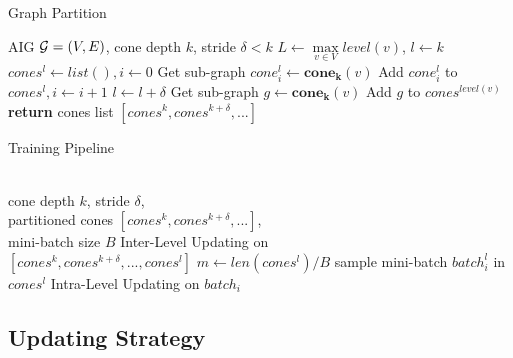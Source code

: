 \begin{minipage}[]{0.47\textwidth}
\begin{algorithm}[H]
\renewcommand{\algorithmicrequire}{\textbf{Input:}}
\renewcommand{\algorithmicensure}{\textbf{Output:}}
\caption{Graph Partition}
\label{alg:partition}
\begin{algorithmic}[1]
    \REQUIRE AIG $\displaystyle {\mathcal{G}}=(V,E)$, cone depth $k$, stride $\delta<k$
        \STATE $L \gets \max\limits_{v\in V}level(v) $, $l\gets k$
        \STATE $cones^l \gets list(), i\gets 0$
        \STATE Get sub-graph $cone^l_i\gets \mathbf{cone_k}(v)$
        \STATE Add $cone^l_i$ to $cones^l, i\gets i+1$
        \ENDFOR
        \STATE $l\gets l+\delta$
        \ENDWHILE
        \STATE Get sub-graph $g\gets \mathbf{cone_k}(v)$
        \STATE Add $g$ to $cones^{level(v)}$
        \ENDFOR
    \STATE \textbf{return} cones list $[cones^k, cones^{k+\delta}, ...]$
\end{algorithmic}  
\end{algorithm}%
\end{minipage}
\hspace{5pt}
\begin{minipage}[]{0.47\textwidth}
\begin{algorithm}[H]
\renewcommand{\algorithmicrequire}{\textbf{Input:}}
\renewcommand{\algorithmicensure}{\textbf{Output:}}
\caption{Training Pipeline}
\label{alg:training}
\begin{algorithmic}[1]
    \REQUIRE \hfill \\cone depth $k$, stride $\delta$,\\ partitioned cones $[cones^k, cones^{k+\delta},...]$, \\ mini-batch size $B$
        \STATE Inter-Level Updating on \\$[cones^k, cones^{k+\delta}, ..., cones^{l}]$
        \ENDIF
        \STATE $m\gets len(cones^l) / B$
        \STATE sample mini-batch $batch^l_i$ in $cones^l$
        \STATE Intra-Level Updating on $batch_i$
        \ENDFOR
        \ENDFOR
\end{algorithmic}  
\end{algorithm}%
\end{minipage}

\vspace{-10pt}
\subsection{Updating Strategy}
\label{sec:updating_strategy}

